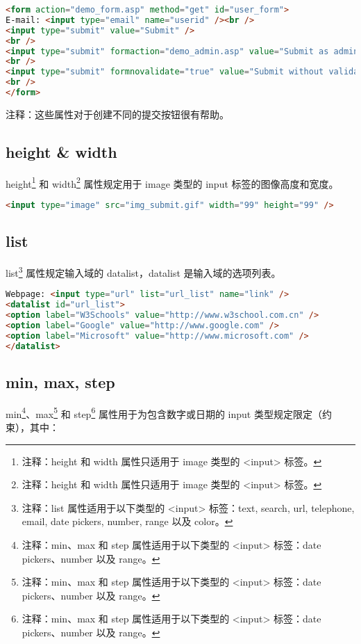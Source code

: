 \begin{lstlisting}[language=HTML]
<form action="demo_form.asp" method="get" id="user_form">
E-mail: <input type="email" name="userid" /><br />
<input type="submit" value="Submit" />
<br />
<input type="submit" formaction="demo_admin.asp" value="Submit as admin" />
<br />
<input type="submit" formnovalidate="true" value="Submit without validation" />
<br />
</form>
\end{lstlisting}

注释：这些属性对于创建不同的提交按钮很有帮助。


\subsection{height \& width}

height\footnote{注释：height 和 width 属性只适用于 image 类型的 <input> 标签。} 和 width\footnote{注释：height 和 width 属性只适用于 image 类型的 <input> 标签。} 属性规定用于 image 类型的 input 标签的图像高度和宽度。

\begin{lstlisting}[language=HTML]
<input type="image" src="img_submit.gif" width="99" height="99" />
\end{lstlisting}




\subsection{list}

list\footnote{注释：list 属性适用于以下类型的 <input> 标签：text, search, url, telephone, email, date pickers, number, range 以及 color。} 属性规定输入域的 datalist，datalist 是输入域的选项列表。


\begin{lstlisting}[language=HTML]
Webpage: <input type="url" list="url_list" name="link" />
<datalist id="url_list">
<option label="W3Schools" value="http://www.w3school.com.cn" />
<option label="Google" value="http://www.google.com" />
<option label="Microsoft" value="http://www.microsoft.com" />
</datalist>
\end{lstlisting}



\subsection{min, max, step}

min\footnote{注释：min、max 和 step 属性适用于以下类型的 <input> 标签：date pickers、number 以及 range。}、max\footnote{注释：min、max 和 step 属性适用于以下类型的 <input> 标签：date pickers、number 以及 range。} 和 step\footnote{注释：min、max 和 step 属性适用于以下类型的 <input> 标签：date pickers、number 以及 range。} 属性用于为包含数字或日期的 input 类型规定限定（约束），其中：

